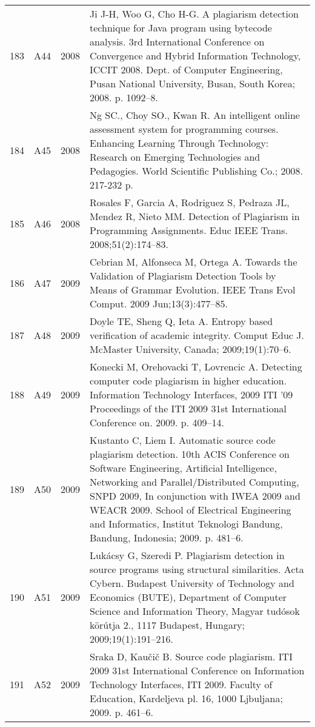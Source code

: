 \documentclass{article}\usepackage[]{graphicx}\usepackage[]{color}
\begin{document}
\begin{longtable}{l|L{1cm}|L{1cm}|L{12cm}|}
  183 & A44 & 2008 & Ji J-H, Woo G, Cho H-G. A plagiarism detection technique for Java program using bytecode analysis. 3rd International Conference on Convergence and Hybrid Information Technology, ICCIT 2008. Dept. of Computer Engineering, Pusan National University, Busan, South Korea; 2008. p. 1092–8. \\ 
  184 & A45 & 2008 & Ng SC., Choy SO., Kwan R. An intelligent online assessment system for programming courses. Enhancing Learning Through Technology: Research on Emerging Technologies and Pedagogies. World Scientific Publishing Co.; 2008. 217-232 p. \\ 
  185 & A46 & 2008 & Rosales F, Garcia A, Rodriguez S, Pedraza JL, Mendez R, Nieto MM. Detection of Plagiarism in Programming Assignments. Educ IEEE Trans. 2008;51(2):174–83. \\ 
  186 & A47 & 2009 & Cebrian M, Alfonseca M, Ortega A. Towards the Validation of Plagiarism Detection Tools by Means of Grammar Evolution. IEEE Trans Evol Comput. 2009 Jun;13(3):477–85. \\ 
  187 & A48 & 2009 & Doyle TE, Sheng Q, Ieta A. Entropy based verification of academic integrity. Comput Educ J. McMaster University, Canada; 2009;19(1):70–6. \\ 
  188 & A49 & 2009 & Konecki M, Orehovacki T, Lovrencic A. Detecting computer code plagiarism in higher education. Information Technology Interfaces, 2009 ITI ’09 Proceedings of the ITI 2009 31st International Conference on. 2009. p. 409–14. \\ 
  189 & A50 & 2009 & Kustanto C, Liem I. Automatic source code plagiarism detection. 10th ACIS Conference on Software Engineering, Artificial Intelligence, Networking and Parallel/Distributed Computing, SNPD 2009, In conjunction with IWEA 2009 and WEACR 2009. School of Electrical Engineering and Informatics, Institut Teknologi Bandung, Bandung, Indonesia; 2009. p. 481–6. \\ 
  190 & A51 & 2009 & Lukácsy G, Szeredi P. Plagiarism detection in source programs using structural similarities. Acta Cybern. Budapest University of Technology and Economics (BUTE), Department of Computer Science and Information Theory, Magyar tudósok körútja 2., 1117 Budapest, Hungary; 2009;19(1):191–216. \\ 
  191 & A52 & 2009 & Sraka D, Kaučič B. Source code plagiarism. ITI 2009 31st International Conference on Information Technology Interfaces, ITI 2009. Faculty of Education, Kardeljeva pl. 16, 1000 Ljbuljana; 2009. p. 461–6. \\ 

\end{longtable}
\end{document}
